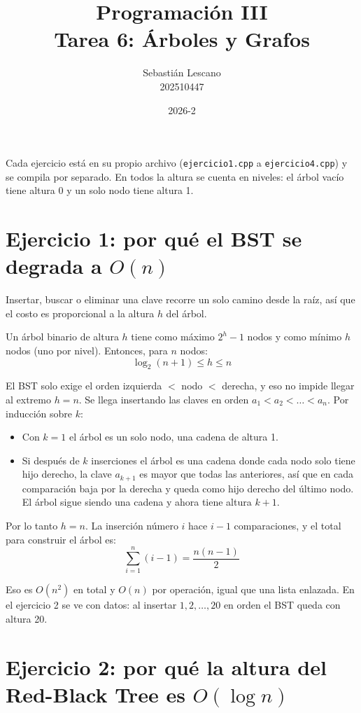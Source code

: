 \documentclass[11pt]{article}
\title{Programación III \\ Tarea 6: Árboles y Grafos}
\author{Sebastián Lescano \\ 202510447}
\date{2026-2}
\begin{document}
\maketitle

Cada ejercicio está en su propio archivo (\texttt{ejercicio1.cpp} a \texttt{ejercicio4.cpp}) y se compila por separado. En todos la altura se cuenta en niveles: el árbol vacío tiene altura 0 y un solo nodo tiene altura 1.

\section{Ejercicio 1: por qué el BST se degrada a $O(n)$}

Insertar, buscar o eliminar una clave recorre un solo camino desde la raíz, así que el costo es proporcional a la altura $h$ del árbol.

Un árbol binario de altura $h$ tiene como máximo $2^h - 1$ nodos y como mínimo $h$ nodos (uno por nivel). Entonces, para $n$ nodos:
\[
\log_2(n + 1) \le h \le n
\]

El BST solo exige el orden izquierda $<$ nodo $<$ derecha, y eso no impide llegar al extremo $h = n$. Se llega insertando las claves en orden $a_1 < a_2 < \dots < a_n$. Por inducción sobre $k$:

\begin{itemize}
\item Con $k = 1$ el árbol es un solo nodo, una cadena de altura 1.
\item Si después de $k$ inserciones el árbol es una cadena donde cada nodo solo tiene hijo derecho, la clave $a_{k+1}$ es mayor que todas las anteriores, así que en cada comparación baja por la derecha y queda como hijo derecho del último nodo. El árbol sigue siendo una cadena y ahora tiene altura $k + 1$.
\end{itemize}

Por lo tanto $h = n$. La inserción número $i$ hace $i - 1$ comparaciones, y el total para construir el árbol es:
\[
\sum_{i=1}^{n} (i - 1) = \frac{n(n - 1)}{2}
\]

Eso es $O(n^2)$ en total y $O(n)$ por operación, igual que una lista enlazada. En el ejercicio 2 se ve con datos: al insertar $1, 2, \dots, 20$ en orden el BST queda con altura 20.

\section{Ejercicio 2: por qué la altura del Red-Black Tree es $O(\log n)$}
\end{document}
